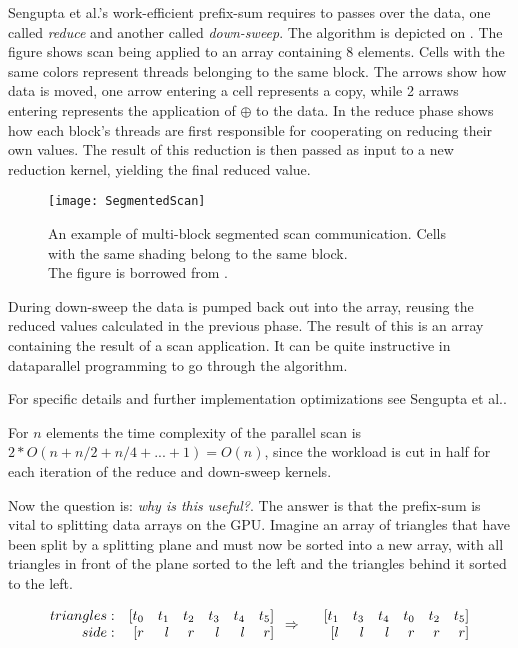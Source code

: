 
Sengupta et al.'s work-efficient prefix-sum
requires to passes over the data, one called \textit{reduce} and
another called \textit{down-sweep}. The algorithm is depicted on
. The figure shows scan being applied to an array
containing 8 elements. Cells with the same colors represent threads
belonging to the same block. The arrows show how data is moved, one
arrow entering a cell represents a copy, while 2 arraws entering
represents the application of $\oplus$ to the data. In the reduce
phase  shows how each block's threads are first
responsible for cooperating on reducing their own values. The result
of this reduction is then passed as input to a new reduction kernel,
yielding the final reduced value.

\begin{figure}
  \centering
  \texttt{[image: SegmentedScan]}
  \caption{An example of multi-block segmented scan
    communication. Cells with the same shading belong to the same
    block. \\The figure is borrowed from .}
  \label{fig:segScan}
\end{figure}

During down-sweep the data is pumped back out into the array, reusing
the reduced values calculated in the previous phase. The result of
this is an array containing the result of a scan application. It can
be quite instructive in dataparallel programming to go through the
algorithm.

For specific details and further implementation optimizations see
Sengupta et al..



For $n$ elements the time complexity of the parallel scan is $2 * O(n
+ n/2 + n/4 + ... + 1) = O(n)$, since the workload is cut in half for
each iteration of the reduce and down-sweep kernels.



Now the question is: \textit{why is this useful?}. The answer is that
the prefix-sum is vital to splitting data arrays on the GPU. Imagine
an array of triangles that have been split by a splitting plane and
must now be sorted into a new array, with all triangles in front of
the plane sorted to the left and the triangles behind it sorted to the
left. 

\begin{displaymath}
  \begin{array} {r r r r r r r}
    triangles: & [t_0 & t_1 & t_2 & t_3 & t_4 & t_5]\\
    side: & [r & l & r & l & l & r]\\
  \end{array}
  \Rightarrow
  \begin{array} {r r r r r r r}
    &[t_1 & t_3 & t_4 & t_0 & t_2 & t_5]\\
    &[l & l & l & r & r & r]\\
  \end{array}
\end{displaymath}

